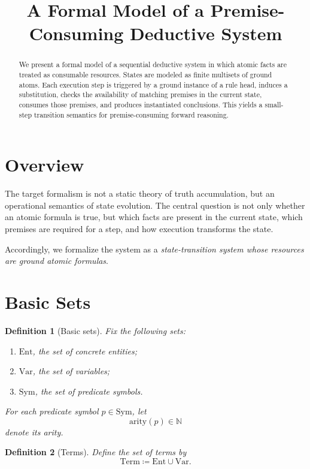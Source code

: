\documentclass[11pt]{article}
\title{A Formal Model of a Premise-Consuming Deductive System}
\author{}
\date{}
\newtheorem{definition}{Definition}[section]
\newcommand{\Ent}{\mathrm{Ent}}
\newcommand{\Var}{\mathrm{Var}}
\newcommand{\Sym}{\mathrm{Sym}}
\newcommand{\Term}{\mathrm{Term}}
\newcommand{\arity}{\mathrm{arity}}
\begin{document}
\maketitle

\begin{abstract}
We present a formal model of a sequential deductive system in which atomic facts are treated as consumable resources. States are modeled as finite multisets of ground atoms. Each execution step is triggered by a ground instance of a rule head, induces a substitution, checks the availability of matching premises in the current state, consumes those premises, and produces instantiated conclusions. This yields a small-step transition semantics for premise-consuming forward reasoning.
\end{abstract}

\section{Overview}

The target formalism is not a static theory of truth accumulation, but an operational semantics of state evolution. The central question is not only whether an atomic formula is true, but which facts are present in the current state, which premises are required for a step, and how execution transforms the state.

Accordingly, we formalize the system as a \emph{state-transition system whose resources are ground atomic formulas}.

\section{Basic Sets}

\begin{definition}[Basic sets]
Fix the following sets:
\begin{enumerate}[label=\arabic*.]
\item $\Ent$, the set of concrete entities;
\item $\Var$, the set of variables;
\item $\Sym$, the set of predicate symbols.
\end{enumerate}
For each predicate symbol $p \in \Sym$, let
\[
\arity(p) \in \mathbb{N}
\]
denote its arity.
\end{definition}

\begin{definition}[Terms]
Define the set of terms by
\[
\Term \coloneqq \Ent \cup \Var.
\]
\end{definition}
\end{document}

